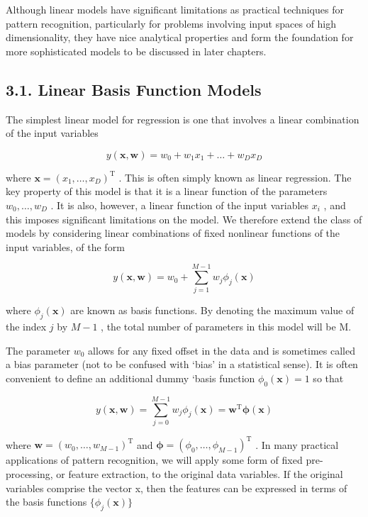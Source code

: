 \documentclass[
  10
]{article}
\begin{document}
Although linear models have significant limitations as practical
techniques for pattern recognition, particularly for problems involving
input spaces of high dimensionality, they have nice analytical
properties and form the foundation for more sophisticated models to be
discussed in later chapters.

\subsection{3.1. Linear Basis Function
Models}\label{linear-basis-function-models}

The simplest linear model for regression is one that involves a linear
combination of the input variables

\[
y (\mathbf {x}, \mathbf {w}) = w _ {0} + w _ {1} x _ {1} + \ldots + w _ {D} x _ {D}\tag{3.1}
\]

where \(\mathbf x = ( x _ { 1 } , \dots , x _ { D } ) ^ { \mathrm T }\)
. This is often simply known as linear regression. The key property of
this model is that it is a linear function of the parameters
\(w _ { 0 } , \ldots , w _ { D }\) . It is also, however, a linear
function of the input variables \(x _ { i }\) , and this imposes
significant limitations on the model. We therefore extend the class of
models by considering linear combinations of fixed nonlinear functions
of the input variables, of the form

\[
y (\mathbf {x}, \mathbf {w}) = w _ {0} + \sum_ {j = 1} ^ {M - 1} w _ {j} \phi_ {j} (\mathbf {x})\tag{3.2}
\]

where \(\phi _ { j } ( \mathbf { x } )\) are known as basis functions.
By denoting the maximum value of the index \(j\) by \(M - 1\) , the
total number of parameters in this model will be M.

The parameter \(w _ { 0 }\) allows for any fixed offset in the data and
is sometimes called a bias parameter (not to be confused with `bias' in
a statistical sense). It is often convenient to define an additional
dummy `basis function \(\phi _ { 0 } ( \mathbf { x } ) = 1\) so that

\[
y (\mathbf {x}, \mathbf {w}) = \sum_ {j = 0} ^ {M - 1} w _ {j} \phi_ {j} (\mathbf {x}) = \mathbf {w} ^ {\mathrm{T}} \boldsymbol {\phi} (\mathbf {x})\tag{3.3}
\]

where
\(\mathbf { w } = ( w _ { 0 } , \hdots , w _ { M - 1 } ) ^ { \mathrm { T } }\)
and
\({ \boldsymbol { \phi } } = \left( \phi _ { 0 } , \ldots , \phi _ { M - 1 } \right) ^ { \mathrm { T } }\)
. In many practical applications of pattern recognition, we will apply
some form of fixed pre-processing, or feature extraction, to the
original data variables. If the original variables comprise the vector
x, then the features can be expressed in terms of the basis functions
\(\{ \phi _ { j } ( \mathbf { x } ) \}\)
\end{document}
